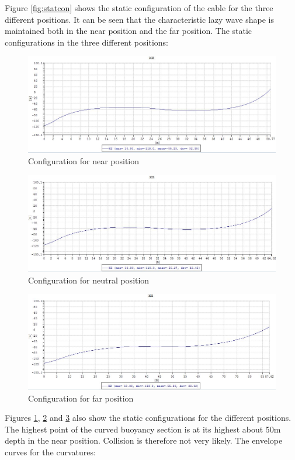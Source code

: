 \noindent Figure \ref{fig:statcon} shows the static configuration of the cable for the three different positions. It can be seen that the characteristic lazy wave shape is maintained both in the near position and the far position. \newline
\newline
The static configurations in the three different positions:
\begin{figure}[H]
\centering
\includegraphics[scale=0.5]{figures/confignear}
\caption[$\; \:$Configuration for near position]{Configuration for near position}
 \label{fig:confignear}
\end{figure}

\begin{figure}[H]
\centering
\includegraphics[scale=0.5]{figures/configneu}
\caption[$\; \:$Configuration for neutral position]{Configuration for neutral position}
 \label{fig:configneu}
\end{figure}

\begin{figure}[H]
\centering
\includegraphics[scale=0.5]{figures/configfar}
\caption[$\; \:$Configuration for far position]{Configuration for far position}
 \label{fig:configfar}
\end{figure}
\noindent Figures \ref{fig:confignear}, \ref{fig:configneu} and \ref{fig:configfar} also show the static configurations for the different positions. The highest point of the curved buoyancy section is at its highest about 50m depth in the near position. Collision is therefore not very likely. \newline
\newline
\noindent The envelope curves for the curvatures:


